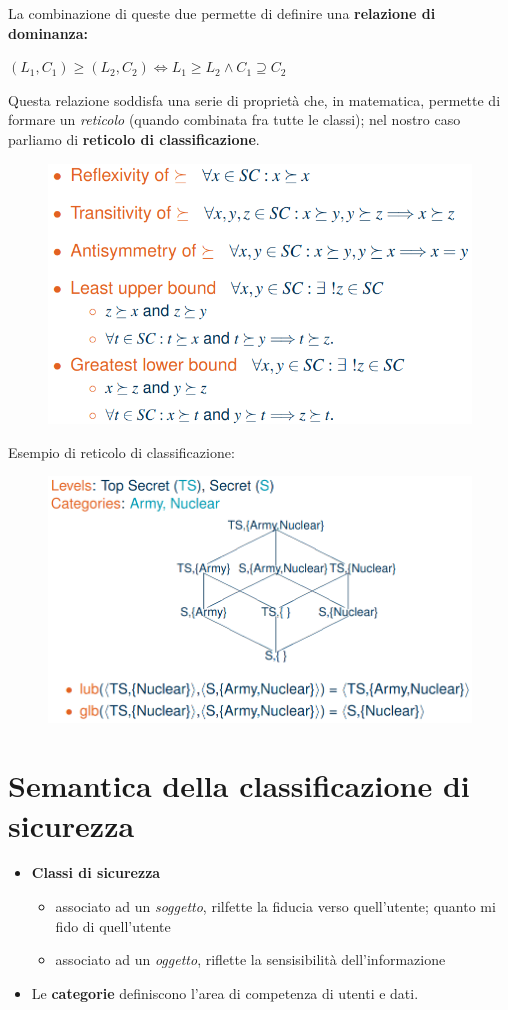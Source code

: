 \documentclass{report}
\begin{document}
\noindent La combinazione di queste due permette di definire una \textbf{relazione di dominanza:}
\begin{center}
    $(L_1, C_1) \geq (L_2, C_2) \Leftrightarrow L_1 \geq L_2 \land C_1 \supseteq C_2$
\end{center}

Questa relazione soddisfa una serie di proprietà che, in matematica, permette di formare 
un \textit{reticolo} (quando combinata fra tutte le classi); nel nostro caso parliamo 
di \textbf{reticolo di classificazione}.

\begin{figure}[H]
    \centering
    \includegraphics[width=0.8\linewidth]{images/props.png}
\end{figure}

\noindent Esempio di reticolo di classificazione:
\begin{figure}[H]
    \centering
    \includegraphics[width=0.8\linewidth]{images/reticolo.png}
\end{figure}

\newpage
\section{Semantica della classificazione di sicurezza}
\begin{itemize}
    \item \textbf{Classi di sicurezza}
    \begin{itemize}
        \item associato ad un \textit{soggetto}, rilfette la fiducia verso quell'utente; quanto mi fido di quell'utente 
        \item associato ad un \textit{oggetto}, riflette la sensisibilità dell'informazione
    \end{itemize}
    \item Le \textbf{categorie} definiscono l'area di competenza di utenti e dati.
\end{itemize}
\end{document}
